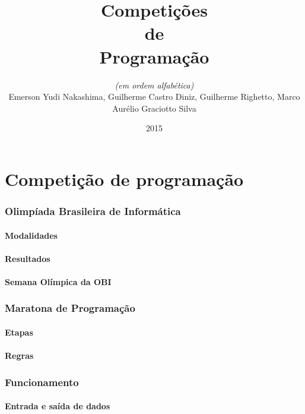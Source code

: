 \documentclass[utf8, usepdftitle=false, svgnames, color={table, fixpdftex, hyperref, fixinclude, xcdraw}, t, brazil]{beamer}
\title{Competições\\de\\Programação}
\author[UTFPR-CM]{\textit{(em ordem alfabética)}\\Emerson Yudi Nakashima, Guilherme Castro Diniz, Guilherme Righetto, Marco Aurélio Graciotto Silva}
\date[]{2015}
\begin{document}
	\frontmatter{}
	

	\part{Competição de programação}

		\section[OBI]{Olimpíada Brasileira de Informática}
		

			\subsection{Modalidades}
			

			\subsection{Resultados}
			

			\subsection{Semana Olímpica da OBI}
			


		\section[ICPC]{Maratona de Programação}
		

			\subsection{Etapas}
			

			\subsection{Regras}
			

			
		\section[Funcionamento]{Funcionamento}
			\subsection{Entrada e saída de dados}
			
\end{document}
